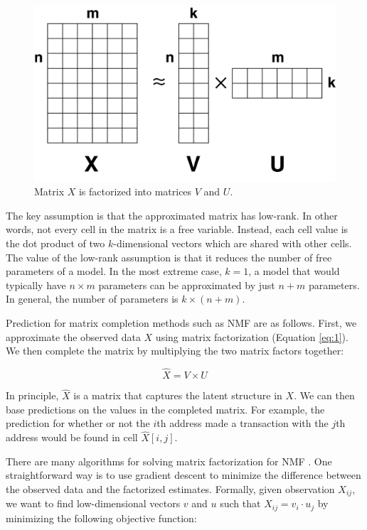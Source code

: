 \documentclass{article} %
\begin{document}
\begin{figure}[!htbp]
    \centering
    \includegraphics[scale=0.2]{figures/matrix_completion}
    \caption{\small Matrix $X$ is factorized into matrices $V$ and $U$.}
    \label{fig:matrix_completion}
\end{figure}

The key assumption is that the approximated matrix has low-rank. In other words, not every cell in the matrix is a free variable. Instead, each cell value is the dot product of two $k$-dimensional vectors which are shared with other cells. The value of the low-rank assumption is that it reduces the number of free parameters of a model. In the most extreme case, $k=1$, a model that would typically have $n \times m$ parameters can be approximated by just $n + m$ parameters. In general, the number of parameters is $k \times (n + m)$.

Prediction for matrix completion methods such as NMF are as follows. First, we approximate the observed data $X$ using matrix factorization (Equation \ref{eq:1}). We then complete the matrix by multiplying the two matrix factors together:

\begin{equation}
\hat{X} = V \times U
\end{equation}

In principle, $\hat{X}$ is a matrix that captures the latent structure in $X$. We can then base predictions on the values in the completed matrix. For example, the prediction for whether or not the $i$th address made a transaction with the $j$th address would be found in cell $\hat{X}[i, j]$.

There are many algorithms for solving matrix factorization for NMF \cite{lee2001algorithms}. One straightforward way is to use gradient descent to minimize the difference between the observed data and the factorized estimates. Formally, given observation $X_{ij}$, we want to find low-dimensional vectors $v$ and $u$ such that $X_{ij} = v_i \cdot  u_j$ by minimizing the following objective function:
\end{document}

